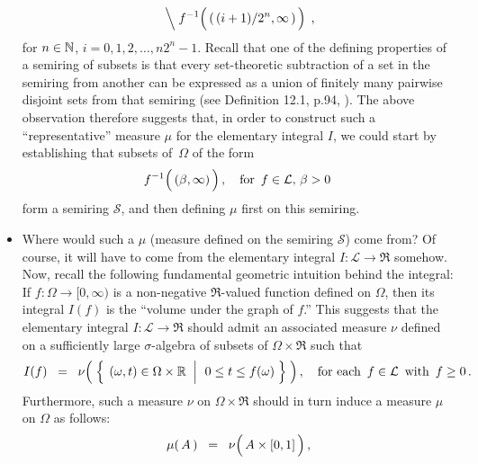 \begin{itemize}
\begin{equation*}
		\;\left\backslash\;
		f^{-1}\!\left(\,(\,(i+1)/2^{n}\overset{{\color{white}\vert}}{,}\,\infty\,)\,\right)
		\right.\,,
	\end{equation*}
	for $n \in \mathbb{N}$, $i = 0, 1, 2, \ldots, n2^{n}-1$.
	Recall that one of the defining properties of a semiring of subsets is that every set-theoretic subtraction
	of a set in the semiring from another can be expressed as a union of finitely many pairwise disjoint sets
	from that semiring (see Definition 12.1, p.94, \cite{Aliprantis1998}).
	The above observation therefore suggests that, in order to construct such a ``representative'' measure
	$\mu$ for the elementary integral $I$, we could start by establishing that
	subsets of \,$\Omega$ of the form
	\begin{equation*}
	f^{-1}\!\left(\,(\beta\overset{{\color{white}\vert}}{,}\,\infty)\,\right),
	\quad\textnormal{for \,$f \in \mathcal{L}$, $\beta > 0$}\,
	\end{equation*}
	form a semiring $\mathcal{S}$, and then defining $\mu$ first on this semiring.
\item
	Where would such a $\mu$ (measure defined on the semiring $\mathcal{S}$) come from?
	Of course, it will have to come from the elementary integral $I : \mathcal{L} \longrightarrow \Re$ somehow.
	Now, recall the following fundamental geometric intuition behind the integral:
	If $f : \Omega \longrightarrow [0,\infty)$ is a non-negative $\Re$-valued function defined on $\Omega$,
	then its integral $I(f)$ is the ``volume under the graph of $f$.''
	This suggests that the elementary integral
	{\color{red}$I : \mathcal{L} \longrightarrow \Re$ should admit an associated measure $\nu$}
	defined on a sufficiently large $\sigma$-algebra of subsets of $\Omega \times \Re$ such that
	\begin{equation*}
	I(f) \;\; = \;\;
		\nu\!\left(\;
		\left\{\;
		\left.
			(\omega,t) \overset{{\color{white}.}}{\in} \Omega \times \Re
		\;\;\right\vert\;\,
			0 \leq t \leq f(\omega)
		\;\right\}
		\;\right),
	\quad
	\textnormal{for each \,$f \in \mathcal{L}$\, with \,$f \geq 0$}\,.
	\end{equation*}
	Furthermore, such a measure
	{\color{red}$\nu$ on $\Omega \times \Re$ should in turn induce a measure $\mu$}
	on $\Omega$ as follows:
	\begin{equation*}
	\mu(\,\overset{{\color{white}.}}{A}\,)
	\;\; = \;\;
		\nu\!\left(\, \overset{{\color{white}.}}{A} \times [0,1] \,\right),
	\end{equation*}

\end{itemize}
